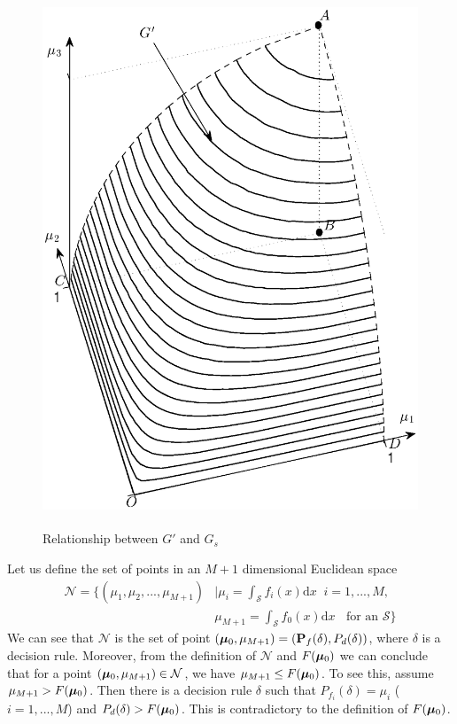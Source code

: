 \begin{figure}[!t]
\centering
\includegraphics[width = 12cm, height=16cm]{2/example_pic.eps}
\caption{Relationship between $G'$ and $G_s$}
\label{fig: feb18}
\end{figure}
Let us define the set of points in an $M+1$ dimensional Euclidean space 
\begin{equation}
\begin{split}
  \mathcal{N} = \{(\mu_1, \mu_2, ..., \mu_{M+1}) &| \mu_i = \int_{\mathcal{S}}f_i(x)\mathrm{d}x \;\;i=1, ..., M,\\
                                            &  \mu_{M+1}=\int_{\mathcal{S}}f_{0}(x)\mathrm{d}x \;\;\text{ for an $\mathcal{S}$}\}
\end{split}
\end{equation}
We can see that $\mathcal{N}$ is the set of point $(\boldsymbol{\mu}_0, \mu_{M+1})=(\mathbf{P}_f(\delta), P_d(\delta))$, where $\delta$ is a decision rule. Moreover, from the definition of $\mathcal{N}$ and $F(\boldsymbol{\mu}_0)$ we can conclude that for a point $(\boldsymbol{\mu}_0, \mu_{M+1}) \in \mathcal{N}$, we have $\mu_{M+1} \leq F(\boldsymbol{\mu}_0)$. 
To see this, assume $\mu_{M+1} > F(\boldsymbol{\mu}_0)$. Then there is a decision rule $\delta$ such that $P_{f_i}(\delta) = \mu_i$ ($i=1, ..., M$) and $P_d(\delta) > F(\boldsymbol{\mu}_0)$. This is contradictory to the definition of $F(\boldsymbol{\mu}_0)$. 

